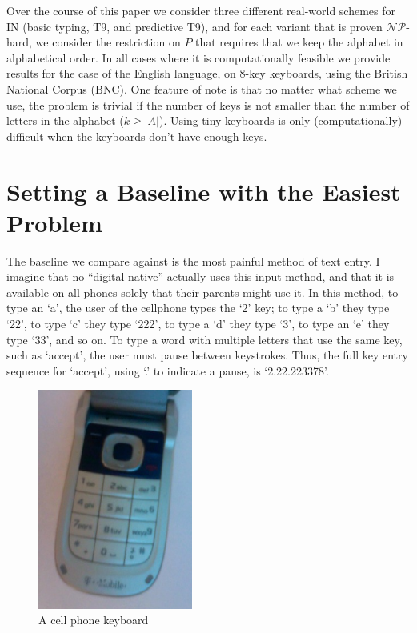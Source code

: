\documentclass[runningheads]{llncs}
\newcommand{\NP}{\ensuremath{\mathcal{NP}}}
\begin{document}
Over the course of this paper we consider three different real-world
schemes for $\mathrm{IN}$ (basic typing, T9, and predictive T9), and for each
variant that is proven \NP-hard, we consider the restriction on $P$ that
requires that we keep the alphabet in alphabetical order.  In all cases
where it is computationally feasible we provide results for the case of
the English language, on 8-key keyboards, using the British National
Corpus\cite{bnc} (BNC).  One feature of note is that no matter what scheme we
use, the problem is trivial if the number of keys is not smaller than the
number of letters in the alphabet ($k \ge |A|$).  Using tiny keyboards is only
(computationally) difficult when the keyboards don't have enough keys.

\section{Setting a Baseline with the Easiest Problem}

The baseline we compare against is the most painful method of text entry.  I
imagine that no ``digital native'' actually uses this input method, and that it
is available on all phones solely that their parents might use it.  In this
method, to type an `a', the user of the cellphone types the `2' key; to type a
`b' they type `22', to type `c' they type `222', to type a `d' they type `3',
to type an `e' they type `33', and so on.  To type a word with multiple
letters that use the same key, such as `accept', the user must pause
between keystrokes.  Thus, the full key entry sequence for `accept', using
`.' to indicate a pause, is `2.22.223378'.

\begin{figure}[t]
\begin{center}
\includegraphics[width=2in]{phonekeys.jpg}
\end{center}
\caption{A cell phone keyboard}
\label{keypic}
\end{figure}
\end{document}
